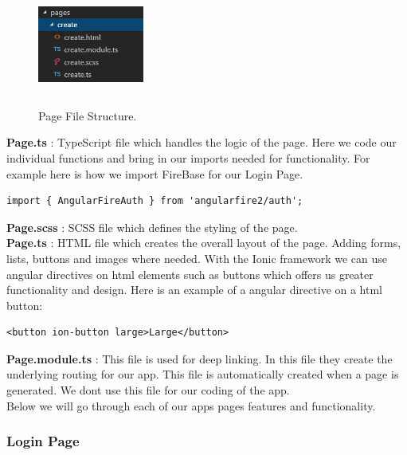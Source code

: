 \begin{figure}[h]
\centering
\includegraphics[width=3.5cm, height=4cm]{img/Pages}
\caption{Page File Structure.}
\end{figure}

\noindent \textbf{Page.ts} : TypeScript file which handles the logic of the page. Here we code our individual functions and bring in our imports needed for functionality. For example here is how we import FireBase for our Login Page. 
    
\begin{verbatim}
import { AngularFireAuth } from 'angularfire2/auth';
\end{verbatim}

\noindent \textbf{Page.scss} : SCSS file which defines the styling of the page.\\

\noindent \textbf{Page.ts} : HTML file which creates the overall layout of the page. Adding forms, lists, buttons and images where needed. With the Ionic framework we can use angular directives on html elements such as buttons which offers us greater functionality and design. Here is an example of a angular directive on a html button:

\begin{verbatim}
<button ion-button large>Large</button>
\end{verbatim}

\noindent \textbf{Page.module.ts} : This file is used for deep linking. In this file they create the underlying routing for our app.\cite{https://ionicframework.com/docs/api/IonicPageModule/} This file is automatically created when a page is generated. We dont use this file for our coding of the app.\\

\noindent Below we will go through each of our apps pages features and functionality.

\subsubsection{Login Page}

